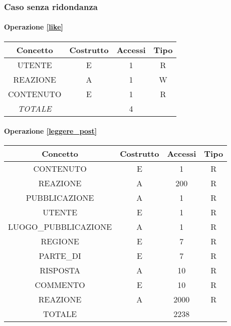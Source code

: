 \documentclass[a4paper,12pt]{report}
\begin{document}
\subsubsection{Caso senza ridondanza}
\begin{table}[H]
\paragraph{Operazione \ref{like}\newline}
\begin{tabular}{|c|c|c|c|}
\hline
Concetto        & Costrutto & Accessi & Tipo \\ \hline
UTENTE          & E         & 1       & R    \\ \hline
REAZIONE        & A         & 1       & W    \\ \hline
CONTENUTO       & E         & 1       & R    \\ \hline
\textit{TOTALE} &           & 4       &      \\ \hline
\end{tabular}
\end{table}
\begin{table}[H]
\paragraph{Operazione \ref{leggere_post}\newline}
\begin{tabular}{|c|c|c|c|}
\hline
Concetto             & Costrutto & Accessi & Tipo \\ \hline
CONTENUTO            & E         & 1       & R    \\ \hline
REAZIONE             & A         & 200     & R    \\ \hline
PUBBLICAZIONE        & A         & 1       & R    \\ \hline
UTENTE               & E         & 1       & R    \\ \hline
LUOGO\_PUBBLICAZIONE & A         & 1       & R    \\ \hline
REGIONE              & E         & 7       & R    \\ \hline
PARTE\_DI            & E         & 7       & R    \\ \hline
RISPOSTA             & A         & 10      & R    \\ \hline
COMMENTO             & E         & 10      & R    \\ \hline
REAZIONE             & A         & 2000    & R    \\ \hline
TOTALE               &           & 2238    &      \\ \hline
\end{tabular}
\end{table}
\end{document}
